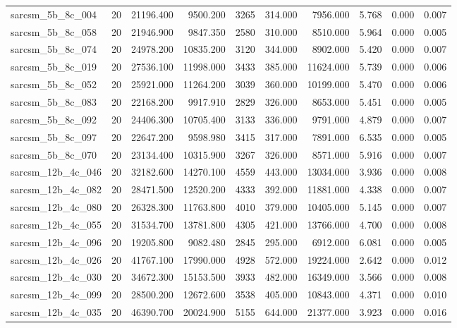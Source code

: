 \begin{tabular}{lrrrrrrrrr}
sarcsm\_5b\_8c\_004 & 20 & 21196.400 & 9500.200 & 3265 & 314.000 & 7956.000 & 5.768 & 0.000 & 0.007 \\
sarcsm\_5b\_8c\_058 & 20 & 21946.900 & 9847.350 & 2580 & 310.000 & 8510.000 & 5.964 & 0.000 & 0.005 \\
sarcsm\_5b\_8c\_074 & 20 & 24978.200 & 10835.200 & 3120 & 344.000 & 8902.000 & 5.420 & 0.000 & 0.007 \\
sarcsm\_5b\_8c\_019 & 20 & 27536.100 & 11998.000 & 3433 & 385.000 & 11624.000 & 5.739 & 0.000 & 0.006 \\
sarcsm\_5b\_8c\_052 & 20 & 25921.000 & 11264.200 & 3039 & 360.000 & 10199.000 & 5.470 & 0.000 & 0.006 \\
sarcsm\_5b\_8c\_083 & 20 & 22168.200 & 9917.910 & 2829 & 326.000 & 8653.000 & 5.451 & 0.000 & 0.005 \\
sarcsm\_5b\_8c\_092 & 20 & 24406.300 & 10705.400 & 3133 & 336.000 & 9791.000 & 4.879 & 0.000 & 0.007 \\
sarcsm\_5b\_8c\_097 & 20 & 22647.200 & 9598.980 & 3415 & 317.000 & 7891.000 & 6.535 & 0.000 & 0.005 \\
sarcsm\_5b\_8c\_070 & 20 & 23134.400 & 10315.900 & 3267 & 326.000 & 8571.000 & 5.916 & 0.000 & 0.007 \\
sarcsm\_12b\_4c\_046 & 20 & 32182.600 & 14270.100 & 4559 & 443.000 & 13034.000 & 3.936 & 0.000 & 0.008 \\
sarcsm\_12b\_4c\_082 & 20 & 28471.500 & 12520.200 & 4333 & 392.000 & 11881.000 & 4.338 & 0.000 & 0.007 \\
sarcsm\_12b\_4c\_080 & 20 & 26328.300 & 11763.800 & 4010 & 379.000 & 10405.000 & 5.145 & 0.000 & 0.007 \\
sarcsm\_12b\_4c\_055 & 20 & 31534.700 & 13781.800 & 4305 & 421.000 & 13766.000 & 4.700 & 0.000 & 0.008 \\
sarcsm\_12b\_4c\_096 & 20 & 19205.800 & 9082.480 & 2845 & 295.000 & 6912.000 & 6.081 & 0.000 & 0.005 \\
sarcsm\_12b\_4c\_026 & 20 & 41767.100 & 17990.000 & 4928 & 572.000 & 19224.000 & 2.642 & 0.000 & 0.012 \\
sarcsm\_12b\_4c\_030 & 20 & 34672.300 & 15153.500 & 3933 & 482.000 & 16349.000 & 3.566 & 0.000 & 0.008 \\
sarcsm\_12b\_4c\_099 & 20 & 28500.200 & 12672.600 & 3538 & 405.000 & 10843.000 & 4.371 & 0.000 & 0.010 \\
sarcsm\_12b\_4c\_035 & 20 & 46390.700 & 20024.900 & 5155 & 644.000 & 21377.000 & 3.923 & 0.000 & 0.016 \\

\end{tabular}
